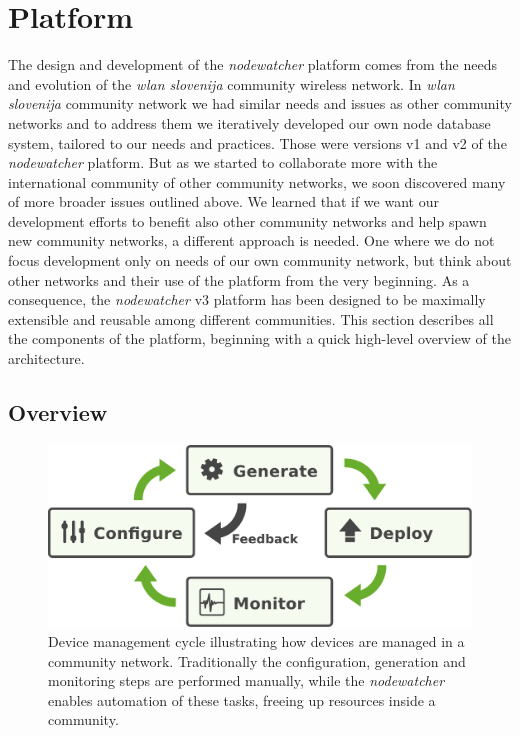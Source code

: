 \documentclass[5p,sort&compress]{elsarticle}
\newcommand{\nodewatcher}{\textit{nodewatcher}}
\newcommand{\wlanslovenija}{\textit{wlan slovenija}}
\begin{document}
\section{Platform}
\label{sec:platform}

The design and development of the \nodewatcher{} platform comes from the needs and evolution of the \wlanslovenija{} community wireless network.
In \wlanslovenija{} community network we had similar needs and issues as other community networks and to address them we iteratively developed our own node database system, tailored to our needs and practices.
Those were versions v1 and v2 of the \nodewatcher{} platform.
But as we started to collaborate more with the international community of other community networks, we soon discovered many of more broader issues outlined above.
We learned that if we want our development efforts to benefit also other community networks and help spawn new community networks, a different approach is needed.
One where we do not focus development only on needs of our own community network, but think about other networks and their use of the platform from the very beginning.
As a consequence, the \nodewatcher{} v3 platform has been designed to be maximally extensible and reusable among different communities.
This section describes all the components of the platform, beginning with a quick high-level overview of the architecture.

\subsection{Overview}

\begin{figure}
  \centering
  \includegraphics[scale=0.4]{figures/device-mgmt-cycle.pdf}
  \caption{Device management cycle illustrating how devices are managed in a community network.
Traditionally the configuration, generation and monitoring steps are performed manually, while the \nodewatcher{} enables automation of these tasks, freeing up resources inside a community.}
  \label{fig:device-mgmt-cycle}
\end{figure}
\end{document}
